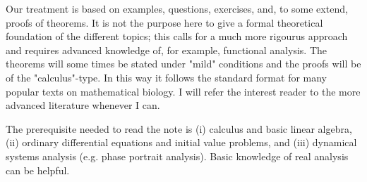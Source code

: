 Our treatment is based on examples, questions, exercises, and, to some extend, proofs of theorems. It is not 
the purpose here to give a formal theoretical foundation of the different topics; this calls for a much more 
rigourus approach and requires advanced knowledge of, for example, functional analysis.  
The theorems will some times be stated under "mild" conditions and the proofs will be of 
the "calculus"-type. In this way it follows the standard format for many popular texts on mathematical 
biology. I will refer the interest reader to the more advanced literature whenever I can. 

The prerequisite needed to read the note is (i) calculus and basic linear algebra, (ii) ordinary differential 
equations and initial value problems, and (iii) dynamical systems analysis (e.g. phase portrait
analysis). Basic knowledge of real analysis can be helpful. 


